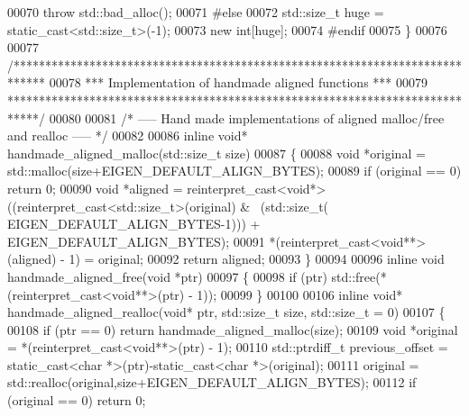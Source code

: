 \begin{DoxyCode}
{00070     \textcolor{keywordflow}{throw} std::bad\_alloc();
00071 \textcolor{preprocessor}{  #else}
00072     std::size\_t huge = \textcolor{keyword}{static\_cast<}std::size\_t\textcolor{keyword}{>}(-1);
00073     \textcolor{keyword}{new} \textcolor{keywordtype}{int}[huge];
00074 \textcolor{preprocessor}{  #endif}
00075 \}
00076 
00077 \textcolor{comment}{/*****************************************************************************}
00078 \textcolor{comment}{*** Implementation of handmade aligned functions                           ***}
00079 \textcolor{comment}{*****************************************************************************/}
00080 
00081 \textcolor{comment}{/* ----- Hand made implementations of aligned malloc/free and realloc ----- */}
00082 
00086 \textcolor{keyword}{inline} \textcolor{keywordtype}{void}* handmade\_aligned\_malloc(std::size\_t size)
00087 \{
00088   \textcolor{keywordtype}{void} *original = std::malloc(size+EIGEN\_DEFAULT\_ALIGN\_BYTES);
00089   \textcolor{keywordflow}{if} (original == 0) \textcolor{keywordflow}{return} 0;
00090   \textcolor{keywordtype}{void} *aligned = \textcolor{keyword}{reinterpret\_cast<}\textcolor{keywordtype}{void}*\textcolor{keyword}{>}((\textcolor{keyword}{reinterpret\_cast<}std::size\_t\textcolor{keyword}{>}(original) & ~(std::size\_t(
      EIGEN\_DEFAULT\_ALIGN\_BYTES-1))) + EIGEN\_DEFAULT\_ALIGN\_BYTES);
00091   *(\textcolor{keyword}{reinterpret\_cast<}\textcolor{keywordtype}{void}**\textcolor{keyword}{>}(aligned) - 1) = original;
00092   \textcolor{keywordflow}{return} aligned;
00093 \}
00094 
00096 \textcolor{keyword}{inline} \textcolor{keywordtype}{void} handmade\_aligned\_free(\textcolor{keywordtype}{void} *ptr)
00097 \{
00098   \textcolor{keywordflow}{if} (ptr) std::free(*(reinterpret\_cast<void**>(ptr) - 1));
00099 \}
00100 
00106 \textcolor{keyword}{inline} \textcolor{keywordtype}{void}* handmade\_aligned\_realloc(\textcolor{keywordtype}{void}* ptr, std::size\_t size, std::size\_t = 0)
00107 \{
00108   \textcolor{keywordflow}{if} (ptr == 0) \textcolor{keywordflow}{return} handmade\_aligned\_malloc(size);
00109   \textcolor{keywordtype}{void} *original = *(\textcolor{keyword}{reinterpret\_cast<}\textcolor{keywordtype}{void}**\textcolor{keyword}{>}(ptr) - 1);
00110   std::ptrdiff\_t previous\_offset = \textcolor{keyword}{static\_cast<}\textcolor{keywordtype}{char} *\textcolor{keyword}{>}(ptr)-static\_cast<char *>(original);
00111   original = std::realloc(original,size+EIGEN\_DEFAULT\_ALIGN\_BYTES);
00112   \textcolor{keywordflow}{if} (original == 0) \textcolor{keywordflow}{return} 0;
}
\end{DoxyCode}
